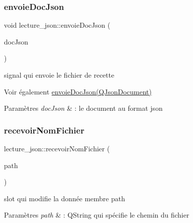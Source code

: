 \subsubsection{\texorpdfstring{envoie\+Doc\+Json}{envoieDocJson}}
{\footnotesize\ttfamily void lecture\+\_\+json\+::envoie\+Doc\+Json (\begin{DoxyParamCaption}\item[{Q\+Json\+Document}]{doc\+Json }\end{DoxyParamCaption})\hspace{0.3cm}{\ttfamily [signal]}}



signal qui envoie le fichier de recette 

\begin{DoxySeeAlso}{Voir également}
\hyperlink{classlecture__json_a62f7f4bea2c9579c37bea5b14177a5db}{envoie\+Doc\+Json(\+Q\+Json\+Document)} 
\end{DoxySeeAlso}

\begin{DoxyParams}{Paramètres}
{\em doc\+Json} & \+: le document au format json \\
\hline
\end{DoxyParams}
\mbox{\label{classlecture__json_a539bb092addd4ee4c75834e4ca413ee7}} 
\subsubsection{\texorpdfstring{recevoir\+Nom\+Fichier}{recevoirNomFichier}}
{\footnotesize\ttfamily lecture\+\_\+json\+::recevoir\+Nom\+Fichier (\begin{DoxyParamCaption}\item[{Q\+String}]{path }\end{DoxyParamCaption})\hspace{0.3cm}{\ttfamily [slot]}}



slot qui modifie la donnée membre path 


\begin{DoxyParams}{Paramètres}
{\em path} & \+: Q\+String qui spécifie le chemin du fichier \\
\hline
\end{DoxyParams}
\mbox{\label{classlecture__json_a88650de275287dc5ddd31f50bdd6d767}} 
